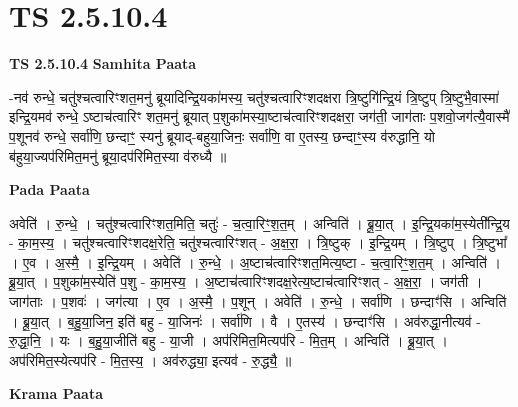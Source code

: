 \documentclass[17pt]{extarticle}
\begin{document}
\section*{ TS 2.5.10.4 }

\textbf{TS 2.5.10.4 } \newline
\textbf{Samhita Paata} \newline

-नव॑ रुन्धे॒ चतु॑श्चत्वारिꣳशत॒मनु॑ ब्रूयादिन्द्रि॒यका॑मस्य॒ चतु॑श्चत्वारिꣳशदक्षरा त्रि॒ष्टुगि॑न्द्रि॒यं त्रि॒ष्टुप् त्रि॒ष्टुभै॒वास्मा॑ इन्द्रि॒यमव॑ रुन्धे॒ ऽष्टाच॑त्वारिꣳ शत॒मनु॑ ब्रूयात् प॒शुका॑मस्या॒ष्टाच॑त्वारिꣳशदक्षरा॒ जग॑ती॒ जाग॑ताः प॒शवो॒जग॑त्यै॒वास्मै॑ प॒शूनव॑ रुन्धे॒ सर्वा॑णि॒ छन्दाꣳ॒॒ स्यनु॑ ब्रूयाद्-बहुया॒जिनः॒ सर्वा॑णि॒ वा ए॒तस्य॒ छन्दाꣳ॒॒स्य व॑रुद्धानि॒ यो ब॑हुया॒ज्यप॑रिमित॒मनु॑ ब्रूया॒दप॑रिमित॒स्या व॑रुध्यै ॥ \newline

\textbf{Pada Paata} \newline

अवेति॑ । रु॒न्धे॒ । चतु॑श्चत्वारिꣳशत॒मिति॒ चतुः॑ - च॒त्वा॒रिꣳ॒॒श॒त॒म् । अन्विति॑ । ब्रू॒या॒त् । इ॒न्द्रि॒यका॑म॒स्येती᳚न्द्रि॒य - का॒म॒स्य॒ । चतु॑श्चत्वारिꣳशदक्ष॒रेति॒ चतु॑श्चत्वारिꣳशत् - अ॒क्ष॒रा॒ । त्रि॒ष्टुक् । इ॒न्द्रि॒यम् । त्रि॒ष्टुप् । त्रि॒ष्टुभा᳚ । ए॒व । अ॒स्मै॒ । इ॒न्द्रि॒यम् । अवेति॑ । रु॒न्धे॒ । अ॒ष्टाच॑त्वारिꣳशत॒मित्य॒ष्टा - च॒त्वा॒रिꣳ॒॒श॒त॒म् । अन्विति॑ । ब्रू॒या॒त् । प॒शुका॑म॒स्येति॑ प॒शु - का॒म॒स्य॒ । अ॒ष्टाच॑त्वारिꣳशदक्ष॒रेत्य॒ष्टाच॑त्वारिꣳशत् - अ॒क्ष॒रा॒ । जग॑ती । जाग॑ताः । प॒शवः॑ । जग॑त्या । ए॒व । अ॒स्मै॒ । प॒शून् । अवेति॑ । रु॒न्धे॒ । सर्वा॑णि । छन्दाꣳ॑सि । अन्विति॑ । ब्रू॒या॒त् । ब॒हु॒या॒जिन॒ इति॑ बहु - या॒जिनः॑ । सर्वा॑णि । वै । ए॒तस्य॑ । छन्दाꣳ॑सि । अव॑रुद्धा॒नीत्यव॑ - रु॒द्धा॒नि॒ । यः । ब॒हु॒या॒जीति॑ बहु - या॒जी । अप॑रिमित॒मित्यप॑रि - मि॒त॒म् । अन्विति॑ । ब्रू॒या॒त् । अप॑रिमित॒स्येत्यप॑रि - मि॒त॒स्य॒ । अव॑रुद्ध्या॒ इत्यव॑ - रु॒द्ध्यै॒ ॥  \newline


\textbf{Krama Paata} \newline
\end{document}
